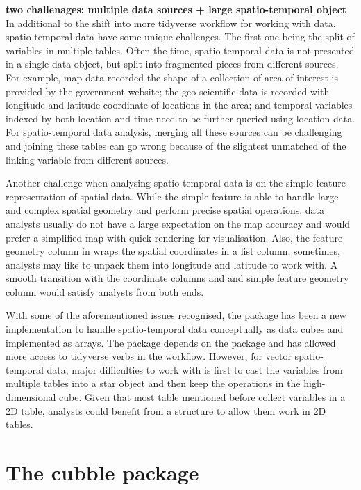 \documentclass[
]{jss}
\begin{document}
\textbf{two challenages: multiple data sources + large spatio-temporal
object} In additional to the shift into more tidyverse workflow for
working with data, spatio-temporal data have some unique challenges. The
first one being the split of variables in multiple tables. Often the
time, spatio-temporal data is not presented in a single data object, but
split into fragmented pieces from different sources. For example, map
data recorded the shape of a collection of area of interest is provided
by the government website; the geo-scientific data is recorded with
longitude and latitude coordinate of locations in the area; and temporal
variables indexed by both location and time need to be further queried
using location data. For spatio-temporal data analysis, merging all
these sources can be challenging and joining these tables can go wrong
because of the slightest unmatched of the linking variable from
different sources.

Another challenge when analysing spatio-temporal data is on the simple
feature representation of spatial data. While the simple feature is able
to handle large and complex spatial geometry and perform precise spatial
operations, data analysts usually do not have a large expectation on the
map accuracy and would prefer a simplified map with quick rendering for
visualisation. Also, the feature geometry column in  wraps the
spatial coordinates in a list column, sometimes, analysts may like to
unpack them into longitude and latitude to work with. A smooth
transition with the coordinate columns and and simple feature geometry
column would satisfy analysts from both ends.

With some of the aforementioned issues recognised, the 
package has been a new implementation to handle spatio-temporal data
conceptually as data cubes and implemented as arrays. The package
depends on the  package and has allowed more access to tidyverse
verbs in the workflow. However, for vector spatio-temporal data, major
difficulties to work with  is first to cast the variables
from multiple tables into a star object and then keep the operations in
the high-dimensional cube. Given that most table mentioned before
collect variables in a 2D table, analysts could benefit from a structure
to allow them work in 2D tables.

\hypertarget{the-cubble-package}{%
\section{The cubble package}\label{the-cubble-package}}
\end{document}
